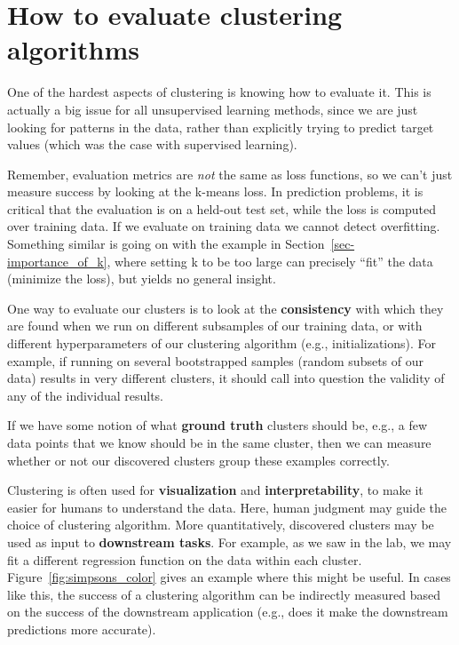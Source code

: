 \section{How to evaluate clustering algorithms}
\label{sec-eval}

One of the hardest aspects of clustering is knowing how to evaluate
it. This is actually a big issue for all unsupervised learning
methods, since we are just looking for patterns in the data, rather
than explicitly trying to predict target values (which was the case
with supervised learning).

Remember, evaluation metrics are \textit{not} the same as loss
functions, so we can't just measure success by looking at the k-means
loss. In prediction problems, it is critical that the evaluation is on
a held-out test set, while the loss is computed over training data. If
we evaluate on training data we cannot detect overfitting. Something
similar is going on with the example in
Section~\ref{sec-importance_of_k}, where setting k to be too large can
precisely ``fit'' the data (minimize the loss), but yields no general
insight.

One way to evaluate our clusters is to look at the
\textbf{consistency} with which they are found when we run on
different subsamples of our training data, or with different
hyperparameters of our clustering algorithm (e.g.,
initializations). For example, if running on several bootstrapped
samples (random subsets of our data) results in very different
clusters, it should call into question the validity of any of the
individual results.

If we have some notion of what \textbf{ground truth} clusters should
be, e.g., a few data points that we know should be in the same
cluster, then we can measure whether or not our discovered clusters
group these examples correctly.

Clustering is often used for \textbf{visualization} and
\textbf{interpretability}, to make it easier for humans to understand
the data. Here, human judgment may guide the choice of clustering
algorithm. More quantitatively, discovered clusters may be used as input to
\textbf{downstream tasks}. For example, as we saw in the lab, we may fit a different
regression function on the data within each
cluster. Figure~\ref{fig:simpsons_color} gives
an example where this might be useful. In cases like this, the success
of a clustering algorithm can be indirectly measured based on the
success of the downstream application (e.g., does it make the
downstream predictions more accurate).

